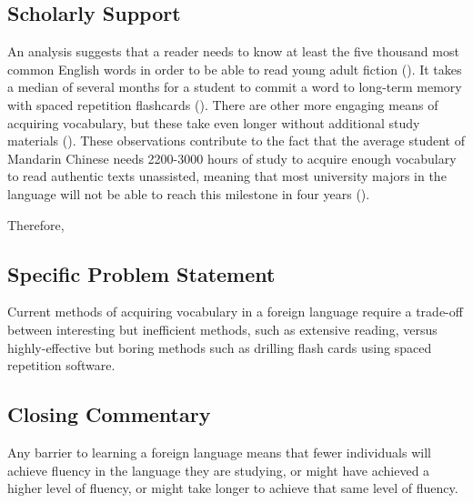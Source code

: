 \documentclass[
	letterpaper, %
]{jdf}
\newcommand{\pcite}[1]{(\cite{#1})}
\begin{document}
\subsection{Scholarly Support}
An analysis suggests that a reader needs to know at least the five thousand most common English words in order to be able to read young adult fiction \pcite{nation1992vocabulary}. It takes a median of several months for a student to commit a word to long-term memory with spaced repetition flashcards \pcite{Murre2015ReplicationAA}. There are other more engaging means of acquiring vocabulary, but these take even longer without additional study materials \pcite{free_voluntary_reading}. These observations contribute to the fact that the average student of Mandarin Chinese needs 2200-3000 hours of study to acquire enough vocabulary to read authentic texts unassisted, meaning that most university majors in the language will not be able to reach this milestone in four years \pcite{Liu2015AnAO}.

Therefore,
\subsection{Specific Problem Statement}
Current methods of acquiring vocabulary in a foreign language require a trade-off between interesting but inefficient methods, such as extensive reading, versus highly-effective but boring methods such as drilling flash cards using spaced repetition software.

\subsection{Closing Commentary}
Any barrier to learning a foreign language means that fewer individuals will achieve fluency in the language they are studying, or might have achieved a higher level of fluency, or might take longer to achieve that same level of fluency. 
\end{document}
